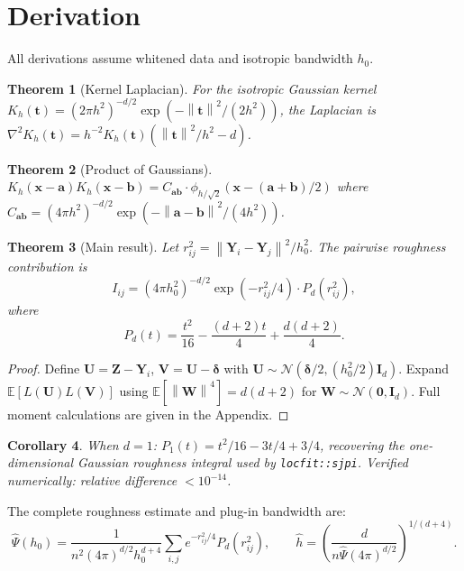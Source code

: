 \documentclass[numsec,webpdf,modern,medium,namedate]{oup-authoring-template}
\theoremstyle{thmstyleone}
\newtheorem{theorem}{Theorem}
\newtheorem{corollary}[theorem]{Corollary}
\theoremstyle{thmstyletwo}
\theoremstyle{thmstylethree}
\newcommand{\E}{\mathbb{E}}
\newcommand{\bx}{\bm{x}}
\newcommand{\bt}{\bm{t}}
\newcommand{\bdelta}{\bm{\delta}}
\newcommand{\bY}{\bm{Y}}
\newcommand{\bZ}{\bm{Z}}
\newcommand{\bU}{\bm{U}}
\newcommand{\bV}{\bm{V}}
\newcommand{\bW}{\bm{W}}
\newcommand{\Id}{\bm{I}_d}
\newcommand{\norm}[1]{\left\| #1 \right\|}
\begin{document}
\section{Derivation}\label{sec:derivation}

All derivations assume whitened data and isotropic bandwidth $h_0$.

\begin{theorem}[Kernel Laplacian]\label{thm:laplacian}
For the isotropic Gaussian kernel $K_h(\bt) = (2\pi h^2)^{-d/2} \exp(-\norm{\bt}^2/(2h^2))$, the Laplacian is $\nabla^2 K_h(\bt) = h^{-2} K_h(\bt)(\norm{\bt}^2/h^2 - d)$.
\end{theorem}

\begin{theorem}[Product of Gaussians]\label{thm:product}
$K_h(\bx{-}\bm{a}) K_h(\bx{-}\bm{b}) = C_{\bm{ab}} \cdot \phi_{h/\sqrt{2}}(\bx - (\bm{a}{+}\bm{b})/2)$ where $C_{\bm{ab}} = (4\pi h^2)^{-d/2} \exp(-\norm{\bm{a}-\bm{b}}^2/(4h^2))$.
\end{theorem}

\begin{theorem}[Main result]\label{thm:main}
Let $r_{ij}^2 = \norm{\bY_i - \bY_j}^2/h_0^2$. The pairwise roughness contribution is
\begin{equation}
I_{ij} = (4\pi h_0^2)^{-d/2} \exp(-r_{ij}^2/4) \cdot P_d(r_{ij}^2),
\end{equation}
where
\begin{equation}
P_d(t) = \frac{t^2}{16} - \frac{(d+2)t}{4} + \frac{d(d+2)}{4}.
\label{eq:Pd}
\end{equation}
\end{theorem}

\begin{proof}
Define $\bU = \bZ - \bY_i$, $\bV = \bU - \bdelta$ with $\bU \sim \mathcal{N}(\bdelta/2, (h_0^2/2)\Id)$. Expand $\E[L(\bU)L(\bV)]$ using $\E[\norm{\bW}^4] = d(d+2)$ for $\bW \sim \mathcal{N}(\bm{0},\Id)$. Full moment calculations are given in the Appendix.
\end{proof}

\begin{corollary}
When $d=1$: $P_1(t) = t^2/16 - 3t/4 + 3/4$, recovering the one-dimensional Gaussian roughness integral used by \texttt{locfit::sjpi}. Verified numerically: relative difference $< 10^{-14}$.
\end{corollary}

The complete roughness estimate and plug-in bandwidth are:
\begin{equation}
\hat{\Psi}(h_0) = \frac{1}{n^2(4\pi)^{d/2}h_0^{d+4}} \sum_{i,j} e^{-r_{ij}^2/4} P_d(r_{ij}^2), \qquad
\hat{h} = \left(\frac{d}{n\hat{\Psi}(4\pi)^{d/2}}\right)^{1/(d+4)}.
\label{eq:formula}
\end{equation}
\end{document}
